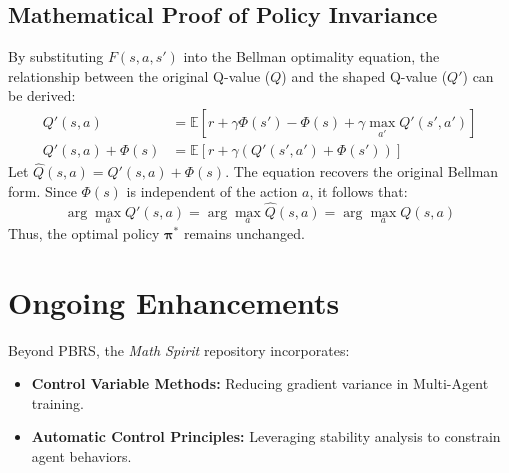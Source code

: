 \documentclass[11pt,a4paper]{article}
\begin{document}
\subsection{Mathematical Proof of Policy Invariance}
By substituting $F(s, a, s')$ into the Bellman optimality equation, the relationship between the original Q-value ($Q$) and the shaped Q-value ($Q'$) can be derived:
\begin{align}
    Q'(s, a) &= \mathbb{E} [r + \gamma \Phi(s') - \Phi(s) + \gamma \max_{a'} Q'(s', a')] \\
    Q'(s, a) + \Phi(s) &= \mathbb{E} [r + \gamma (Q'(s', a') + \Phi(s'))]
\end{align}
Let $\hat{Q}(s, a) = Q'(s, a) + \Phi(s)$. The equation recovers the original Bellman form. Since $\Phi(s)$ is independent of the action $a$, it follows that:
\[ \arg\max_a Q'(s, a) = \arg\max_a \hat{Q}(s, a) = \arg\max_a Q(s, a) \]
Thus, the optimal policy $\bm{\pi^*}$ remains unchanged.

\section{Ongoing Enhancements}
Beyond PBRS, the \textit{Math Spirit} repository incorporates:
\begin{itemize}
    \item \textbf{Control Variable Methods:} Reducing gradient variance in Multi-Agent training.
    \item \textbf{Automatic Control Principles:} Leveraging stability analysis to constrain agent behaviors.
\end{itemize}
\end{document}
